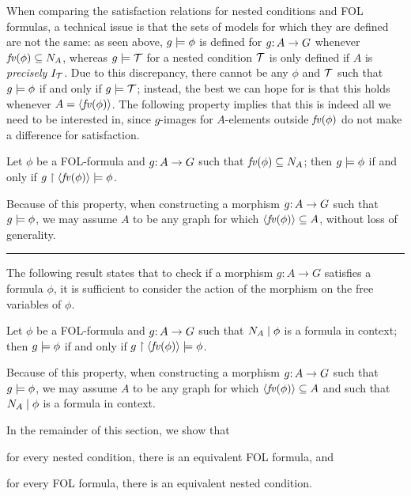 When comparing the satisfaction relations for nested conditions and FOL formulas, a technical issue is that the sets of models for which they are defined are not the same: as seen above, $g\models\phi$ is defined for $g{:}\, A\rightarrow G$ whenever $\mathit{fv}(\phi)\subseteq N_A$, whereas $g\models{\mathcal{T}}$ for a nested condition ${\mathcal{T}}$ is only defined if $A$ is \emph{precisely} $I_{\mathcal{T}}$. Due to this discrepancy, there cannot be any $\phi$ and ${\mathcal{T}}$ such that $g\models \phi$ if and only if $g\models {\mathcal{T}}$; instead, the best we can hope for is that this holds whenever $A=\langle \mathit{fv}(\phi)\rangle$. The following property implies that this is indeed all we need to be interested in, since $g$-images for $A$-elements outside $\mathit{fv}(\phi)$ do not make a difference for satisfaction.

\begin{proposition}\label{prop:free vars only-old}
Let $\phi$ be a FOL-formula and $g{:}\, A\rightarrow G$ such that $\mathit{fv}(\phi)\subseteq N_A$; then $g\models \phi$ if and only if $g\restriction \langle \mathit{fv}(\phi)\rangle\models \phi$.
\end{proposition}
%
Because of this property, when constructing a morphism $g{:}\, A\rightarrow G$ such that $g\models \phi$, we may assume $A$ to be any graph for which $\langle \mathit{fv}(\phi)\rangle\subseteq A$, without loss of generality.

\medskip

\hrule

The following result states that to check if a morphism $g:A \to G$ satisfies a formula $\phi$, it is sufficient to consider the action of the morphism on the free variables of $\phi$.

\begin{proposition}\label{prop:free vars only}
	Let $\phi$ be a FOL-formula and $g{:}\, A\rightarrow G$ such that ${N_A} \mid {\phi}$ is a formula in context; then $g\models \phi$ if and only if $g\restriction \langle \mathit{fv}(\phi)\rangle\models \phi$.
\end{proposition}
%
Because of this property, when constructing a morphism $g{:}\, A\rightarrow G$ such that $g\models \phi$, we may assume $A$ to be any graph for which $\langle \mathit{fv}(\phi)\rangle\subseteq A$ and such that ${N_A} \mid {\phi}$ is a formula in context.

\medskip

In the remainder of this section, we show that
%
\begin{inumerate}
\item for every nested condition, there is an 
equivalent FOL formula, and
\item for every FOL formula, there is an 
equivalent nested condition.
\end{inumerate}
%
